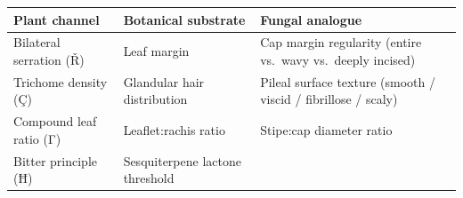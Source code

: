 \documentclass[12pt,a4paper]{article}
\begin{document}
\begin{longtable}[]{@{}lll@{}}
\toprule
\begin{minipage}[b]{0.30\columnwidth}\raggedright
Plant channel\strut
\end{minipage} & \begin{minipage}[b]{0.30\columnwidth}\raggedright
Botanical substrate\strut
\end{minipage} & \begin{minipage}[b]{0.30\columnwidth}\raggedright
Fungal analogue\strut
\end{minipage}\tabularnewline
\midrule
\endhead
\begin{minipage}[t]{0.30\columnwidth}\raggedright
Bilateral serration (Ř)\strut
\end{minipage} & \begin{minipage}[t]{0.30\columnwidth}\raggedright
Leaf margin\strut
\end{minipage} & \begin{minipage}[t]{0.30\columnwidth}\raggedright
Cap margin regularity (entire vs.~wavy vs.~deeply incised)\strut
\end{minipage}\tabularnewline
\begin{minipage}[t]{0.30\columnwidth}\raggedright
Trichome density (Ç)\strut
\end{minipage} & \begin{minipage}[t]{0.30\columnwidth}\raggedright
Glandular hair distribution\strut
\end{minipage} & \begin{minipage}[t]{0.30\columnwidth}\raggedright
Pileal surface texture (smooth / viscid / fibrillose / scaly)\strut
\end{minipage}\tabularnewline
\begin{minipage}[t]{0.30\columnwidth}\raggedright
Compound leaf ratio (Γ)\strut
\end{minipage} & \begin{minipage}[t]{0.30\columnwidth}\raggedright
Leaflet:rachis ratio\strut
\end{minipage} & \begin{minipage}[t]{0.30\columnwidth}\raggedright
Stipe:cap diameter ratio\strut
\end{minipage}\tabularnewline
\begin{minipage}[t]{0.30\columnwidth}\raggedright
Bitter principle (Ħ)\strut
\end{minipage} & \begin{minipage}[t]{0.30\columnwidth}\raggedright
Sesquiterpene lactone threshold\strut

\end{minipage}
\end{longtable}
\end{document}

